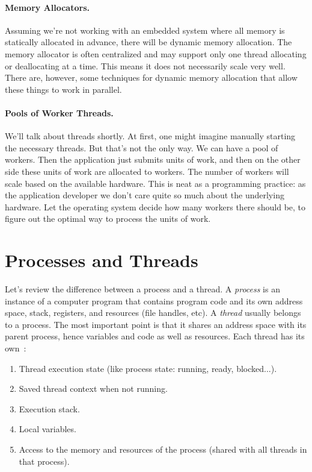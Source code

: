 \documentclass[a4paper]{report}
\begin{document}
\paragraph{Memory Allocators.}
Assuming we're not working with an embedded system where all memory is statically allocated in advance, there will be dynamic memory allocation. The memory allocator is often centralized and may support only one thread allocating or deallocating at a time. This means it does not necessarily scale very well. There are, however, some techniques for dynamic memory allocation that allow these things to work in parallel.

\paragraph{Pools of Worker Threads.}
We'll talk about threads shortly. At first, one might imagine manually starting the necessary threads. But that's not the only way. We can have a pool of workers. Then the application just submits units of work, and then on the other side these units of work are allocated to workers. The number of workers will scale based on the available hardware. This is neat as a programming practice: as the application developer we don't care quite so much about the underlying hardware. Let the operating system decide how many workers there should be, to figure out the optimal way to process the units of work.

\section*{Processes and Threads} Let's review the
difference between a process and a thread. A \emph{process} is an
instance of a computer program that contains program code and its own
address space, stack, registers, and resources (file handles, etc).  A
\emph{thread} usually belongs to a process. The most important point
is that it shares an address space with its parent process, hence
variables and code as well as resources. Each thread has its own~\cite{osi}:
\begin{enumerate}
	\item Thread execution state (like process state: running, ready, blocked...).
	\item Saved thread context when not running.
	\item Execution stack.
	\item Local variables.
	\item Access to the memory and resources of the process (shared with all threads in that process).
\end{enumerate}
\end{document}
